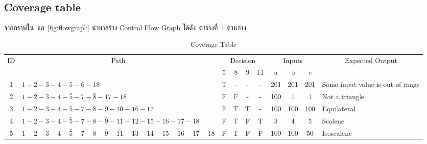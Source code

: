 \documentclass[12pt,a4paper]{article}
\newcommand{\outbound}{Some input value is out of range}
\newcommand{\nottriangle}{Not a triangle}
\newcommand{\equ}{Equilateral}
\newcommand{\sca}{Scalene}
\newcommand{\iso}{Isoscalene}
\newcommand{\numbername}{ข้อ}
\renewcommand{\tablename}{ตารางที่}
\begin{document}
\newpage
\clearpage
\begin{landscape}
    \section{Coverage table}
    จากกราฟใน~\numbername~\ref{fig:flowgraph} นำมาสร้าง Control Flow Graph ได้ดัง~\tablename~\ref{tab:coveragetable} ด้านล่าง
    \label{sec:coveragetable}
    \begin{table}[hb!]
        \caption{Coverage Table}
        \label{tab:coveragetable}
        \begin{center}
            \begin{tabular}[p]{ | c | l | *{7}{c|} l |}
                \hline
                \multirow{2}{*}{ID} & \multicolumn{1}{c}{\multirow{2}{*}{Path}} & \multicolumn{4}{|c|}{Decision} & \multicolumn{3}{|c|}{Inputs} & \multicolumn{1}{c|}{\multirow{2}{*}{Expected Output}} \\ \cline{3-9}
                                    &                                           & 5 & 8 & 9 & 11 & a   & b   & c   &                \\ \hline
                1 & $1-2-3-4-5-6-18$                                            & T & - & - & -  & 201 & 201 & 201 & \outbound      \\ \hline
                2 & $1-2-3-4-\bar{5}-7-\bar{8}-17-18$                           & F & F & - & -  & 100 & 1   & 1   & \nottriangle   \\ \hline
                3 & $1-2-3-4-\bar{5}-7-8-9-10-16-17$                            & F & T & T & -  & 100 & 100 & 100 & \equ           \\ \hline
                4 & $1-2-3-4-\bar{5}-7-8-\bar{9}-11-12-15-16-17-18$             & F & T & F & T  &   3 &   4 &   5 & \sca           \\ \hline
                5 & $1-2-3-4-\bar{5}-7-8-\bar{9}-\bar{11}-13-14-15-16-17-18$    & F & T & F & F  & 100 & 100 &  50 & \iso           \\ \hline
            \end{tabular}
        \end{center}
    \end{table}

\end{landscape}
\end{document}
